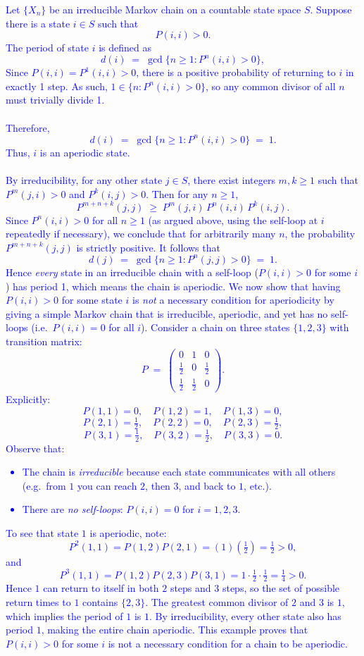 \documentclass{article}
\begin{document}
\textcolor{blue}{
Let $\{X_n\}$ be an irreducible Markov chain on a countable state space $S$. Suppose there is a state $i \in S$ such that
\[
    P(i,i) > 0.
\]
The period of state $i$ is defined as
\[
    d(i) \;=\; \gcd \{ n \ge 1 : P^n(i,i) > 0 \},
\]
Since $P(i,i) = P^1(i,i)> 0$, there is a positive probability of returning to $i$ in exactly 1 step. As such, $1 \in \{n: P^n(i,i) > 0\}$, so any common divisor of all $n$ must trivially divide 1. \\ \\ Therefore,
\[
    d(i) \;=\; \gcd \{ n \ge 1 : P^n(i,i) > 0 \} \;=\; 1.
\]
Thus, $i$ is an aperiodic state. \\ \\ 
By irreducibility, for any other state $j \in S$, there exist integers $m,k \ge 1$ such that $P^m(j,i) > 0$ and $P^k(i,j) > 0$. Then for any $n \ge 1$,
\[
    P^{m+n+k}(j,j) 
    \;\ge\; P^m(j,i) \, P^n(i,i) \, P^k(i,j).
\]
Since $P^n(i,i) > 0$ for all $n \ge 1$ (as argued above, using the self-loop at $i$ repeatedly if necessary), we conclude that for arbitrarily many $n$, the probability $P^{m+n+k}(j,j)$ is strictly positive. It follows that
\[
    d(j) \;=\; \gcd\{ n \ge 1 : P^n(j,j) > 0 \} \;=\; 1.
\]
Hence \emph{every} state in an irreducible chain with a self-loop ($P(i,i) > 0$ for some $i$) has period 1, which means the chain is aperiodic.
\bigskip
We now show that having $P(i,i) > 0$ for some state $i$ is \emph{not} a necessary condition for aperiodicity by giving a simple Markov chain that is irreducible, aperiodic, and yet has no self-loops (i.e.\ $P(i,i)=0$ for all $i$).
Consider a chain on three states $\{1,2,3\}$ with transition matrix:
\[
    P \;=\; \begin{pmatrix}
    0 & 1 & 0 \\[6pt]
    \tfrac{1}{2} & 0 & \tfrac{1}{2} \\[6pt]
    \tfrac{1}{2} & \tfrac{1}{2} & 0
    \end{pmatrix}.
\]
Explicitly:
\[
    P(1,1)=0, \quad P(1,2)=1, \quad P(1,3)=0, 
\]
\[
    P(2,1)=\tfrac{1}{2}, \quad P(2,2)=0, \quad P(2,3)=\tfrac{1}{2},
\]
\[
    P(3,1)=\tfrac{1}{2}, \quad P(3,2)=\tfrac{1}{2}, \quad P(3,3)=0.
\]
Observe that:
\begin{itemize}
    \item The chain is \emph{irreducible} because each state communicates with all others (e.g.\ from $1$ you can reach $2$, then $3$, and back to $1$, etc.).
    \item There are \emph{no self-loops}: $P(i,i)=0$ for $i=1,2,3$.
\end{itemize}
To see that state $1$ is aperiodic, note:
\[
    P^2(1,1) = P(1,2)P(2,1) = (1)\left(\tfrac{1}{2}\right) = \tfrac{1}{2} > 0,
\]
and
\[
    P^3(1,1) = P(1,2)P(2,3)P(3,1) = 1 \cdot \tfrac{1}{2} \cdot \tfrac{1}{2}
    = \tfrac{1}{4} > 0.
\]
Hence $1$ can return to itself in both $2$ steps and $3$ steps, so the set of possible return times to $1$ contains $\{2,3\}$. The greatest common divisor of $2$ and $3$ is $1$, which implies the period of $1$ is $1$. By irreducibility, every other state also has period $1$, making the entire chain aperiodic.
This example proves that $P(i,i) > 0$ for some $i$ is not a necessary condition for a chain to be aperiodic.
}
\end{document}
